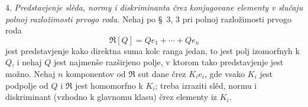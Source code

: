 \documentclass[11pt]{article}
\begin{document}
\setcounter{footnote}{27}

4. \emph{Predstavjenje slěda, normy i diskriminanta črez konjugovane elementy v slučaju polnoj razložimosti prvogo roda.} Nehaj po \S~3, 3 pri polnoj razložimosti prvogo roda
\[
        \mathfrak R[Q]=Qe_1+\cdots+Qe_n
\]
jest predstavjenje kako direktna suma kolc ranga jedan, to jest polj izomorfnyh k $Q$, i nehaj $Q$ jest najmenše razširjeno polje, v ktorom tako predstavjenje jest možno. Nehaj $n$ komponentov od $\mathfrak R$ sut dane črez $K_i e_i$, gde vsako $K_i$ jest podpolje od $Q$ i $\mathfrak R$ jest homomorfno k $K_i$; treba izraziti slěd, normu i diskriminant (vzhodno k glavnomu klasu) črez elementy iz $K_i$.
\end{document}
